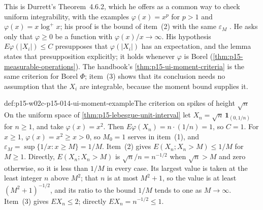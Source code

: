 This is Durrett's Theorem~4.6.2, which he offers as a common way to check
uniform integrability, with the examples \(\varphi(x)=x^p\) for \(p>1\)
and \(\varphi(x)=x\log^+x\); his proof is the bound of item~(2) with the
same \(\varepsilon_M\) \cite[Theorem~4.6.2, p.~245]{DurrettPTEAuthor2019}.
He asks only that \(\varphi\geq0\) be a function with
\(\varphi(x)/x\to\infty\). His hypothesis \(E\varphi(|X_i|)\leq C\)
presupposes that \(\varphi(|X_i|)\) has an expectation, and the lemma
states that presupposition explicitly; it holds whenever \(\varphi\) is
Borel (\cref{thm:p15-measurable-operations}). The handbook's
\cref{thm:p15-ui-moment-criteria} is the same criterion for Borel
\(\Phi\); item~(3) shows that its conclusion needs no assumption that the
\(X_i\) are integrable, because the moment bound supplies it.

\begin{hbexample}{def:p15-w02c-p15-014-ui-moment-example}{The criterion on spikes of height \(\sqrt n\)}
On the uniform space of \cref{thm:p15-lebesgue-unit-interval} let
\(X_n=\sqrt n\,\mathbf1_{(0,1/n)}\) for \(n\geq1\), and take
\(\varphi(x)=x^2\). Then \(E\varphi(X_n)=n\cdot(1/n)=1\), so \(C=1\).
For \(x\geq1\), \(\varphi(x)=x^2\geq x>0\), so \(M_0=1\) serves in
item~(1), and \(\varepsilon_M=\sup\{1/x:x\geq M\}=1/M\). Item~(2) gives
\(E(X_n;X_n>M)\leq1/M\) for \(M\geq1\). Directly, \(E(X_n;X_n>M)\) is
\(\sqrt n/n=n^{-1/2}\) when \(\sqrt n>M\) and zero otherwise, so it is
less than \(1/M\) in every case. Its largest value is taken at the least
integer \(n\) above \(M^2\); that \(n\) is at most \(M^2+1\), so the value
is at least \((M^2+1)^{-1/2}\), and its ratio to the bound \(1/M\) tends
to one as \(M\to\infty\). Item~(3) gives \(E X_n\leq2\);
directly \(E X_n=n^{-1/2}\leq1\).
\end{hbexample}

